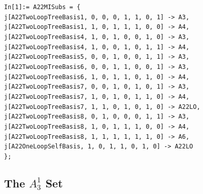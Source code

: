\begin{mdframed}[backgroundcolor=gray!10, linewidth=0pt]
\texttt{In[1]:= A22MISubs = \{\\
   j[A22TwoLoopTreeBasis1, 0, 0, 0, 1, 1, 0, 1] -> A3,\\
   j[A22TwoLoopTreeBasis1, 1, 0, 1, 1, 1, 0, 0] -> A4,\\
   j[A22TwoLoopTreeBasis4, 1, 0, 1, 0, 0, 1, 0] -> A3,\\
   j[A22TwoLoopTreeBasis4, 1, 0, 0, 1, 0, 1, 1] -> A4,\\
   j[A22TwoLoopTreeBasis5, 0, 0, 1, 0, 0, 1, 1] -> A3,\\
   j[A22TwoLoopTreeBasis6, 0, 0, 1, 1, 0, 0, 1] -> A3,\\
   j[A22TwoLoopTreeBasis6, 1, 0, 1, 1, 0, 1, 0] -> A4,\\
   j[A22TwoLoopTreeBasis7, 0, 0, 1, 0, 1, 0, 1] -> A3,\\
   j[A22TwoLoopTreeBasis7, 1, 0, 1, 0, 1, 1, 0] -> A4,\\
   j[A22TwoLoopTreeBasis7, 1, 1, 0, 1, 0, 1, 0] -> A22LO,\\
   j[A22TwoLoopTreeBasis8, 0, 1, 0, 0, 0, 1, 1] -> A3,\\
   j[A22TwoLoopTreeBasis8, 1, 0, 1, 1, 1, 0, 0] -> A4,\\
   j[A22TwoLoopTreeBasis8, 1, 1, 1, 1, 1, 1, 0] -> A6,\\
   j[A22OneLoopSelfBasis, 1, 0, 1, 1, 0, 1, 0] -> A22LO\\
   \};}
\end{mdframed}

\subsection{The $A_3^1$ Set}

